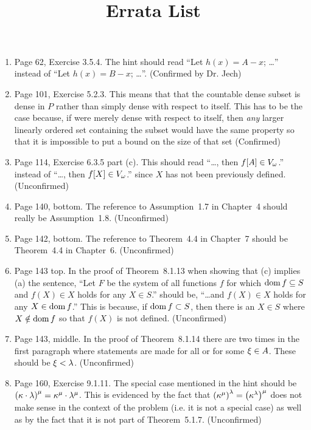 \documentclass{report}
\title{
  \booktitle \\
  \ \\
  Errata List
}
\begin{document}
\maketitle

\begin{enumerate}

\item Page 62, Exercise 3.5.4. The hint should read ``Let $h(x) = A - x$; \ldots'' instead of ``Let $h(x) = B - x$; \ldots''.
  (Confirmed by Dr. Jech)

\item Page 101, Exercise 5.2.3. This means that that the countable dense subset is dense in $P$ rather than simply dense with respect to itself.
  This has to be the case because, if were merely dense with respect to itself, then \emph{any} larger linearly ordered set containing the subset would have the same property so that it is impossible to put a bound on the size of that set (Confirmed)

\item Page 114, Exercise 6.3.5 part (c). This should read ``\ldots, then $f[A] \in V_\omega$.'' instead of ``\ldots, then $f[X] \in V_\omega$.'' since $X$ has not been previously defined. (Unconfirmed)

\item Page 140, bottom. The reference to Assumption~1.7 in Chapter~4 should really be Assumption~1.8. (Unconfirmed)

\item Page 142, bottom. The reference to Theorem~4.4 in Chapter~7 should be Theorem~4.4 in Chapter~6. (Unconfirmed)

\item Page 143 top. In the proof of Theorem~8.1.13 when showing that (c) implies (a) the sentence, ``Let $F$ be the system of all functions $f$ for which $\mathrm{dom}\,{f} \subseteq S$ and $f(X) \in X$ holds for any $X \in S$.'' should be, ``\ldots and $f(X) \in X$ holds for any $X \in \mathrm{dom}\,{f}$.''
  This is because, if $\mathrm{dom}\,{f} \subset S$, then there is an $X \in S$ where $X \notin \mathrm{dom}\,{f}$ so that $f(X)$ is not defined. (Unconfirmed)

\item Page 143, middle. In the proof of Theorem~8.1.14 there are two times in the first paragraph where statements are made for all or for some $\xi \in A$.
  These should be $\xi < \lambda$. (Unconfirmed)

\item Page 160, Exercise 9.1.11.
  The special case mentioned in the hint should be $\left( \kappa \cdot \lambda \right)^\mu = \kappa^\mu \cdot \lambda^\mu$.
  This is evidenced by the fact that $\left( \kappa^\mu \right)^\lambda = \left( \kappa^\lambda \right)^\mu$ does not make sense in the context of the problem (i.e. it is not a special case) as well as by the fact that it is not part of Theorem~5.1.7. (Unconfirmed)
  
\end{enumerate}
\end{document}
